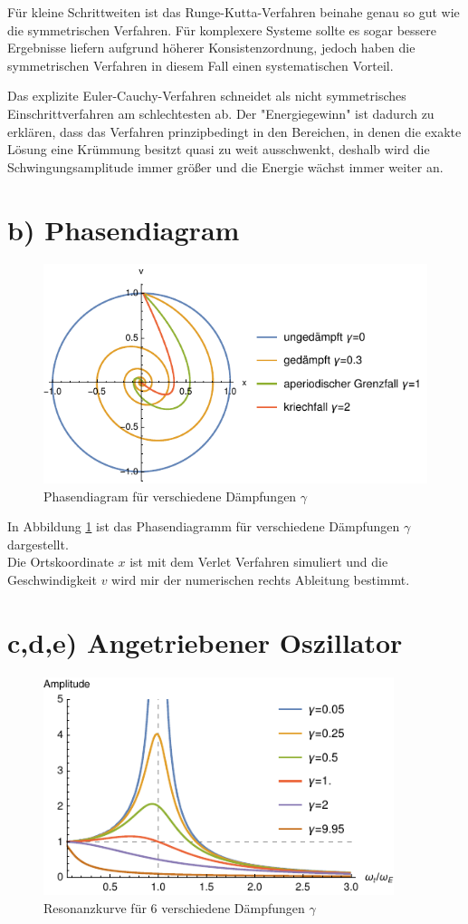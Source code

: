 Für kleine Schrittweiten ist das Runge-Kutta-Verfahren beinahe genau so gut wie die symmetrischen Verfahren. Für komplexere Systeme sollte es sogar bessere Ergebnisse liefern aufgrund höherer Konsistenzordnung, jedoch haben die symmetrischen Verfahren in diesem Fall einen systematischen Vorteil.

Das explizite Euler-Cauchy-Verfahren schneidet als nicht symmetrisches Einschrittverfahren am schlechtesten ab. Der "Energiegewinn" ist dadurch zu erklären, dass das Verfahren prinzipbedingt in den Bereichen, in denen die exakte Lösung eine Krümmung besitzt quasi zu weit ausschwenkt, deshalb wird die Schwingungsamplitude immer größer und die Energie wächst immer weiter an.


\section*{b) Phasendiagram}
\begin{figure}[h!]
	\centering
	\includegraphics[width=400pt]{B_Phase.pdf}
	\caption{Phasendiagram für verschiedene Dämpfungen $\gamma$}
	\label{fig:phase}
\end{figure}
In Abbildung \ref{fig:phase} ist das Phasendiagramm für verschiedene Dämpfungen $\gamma$ dargestellt.\\
Die Ortskoordinate $x$ ist mit dem Verlet Verfahren simuliert und die Geschwindigkeit $v$ wird mir der numerischen rechts Ableitung bestimmt.

\section*{c,d,e) Angetriebener Oszillator}
\begin{figure}[t]
	\centering
	\includegraphics[width=290pt]{C_Seite.pdf}
	\caption{Resonanzkurve für 6 verschiedene Dämpfungen $\gamma$}
	\label{fig:seite}
\end{figure}

